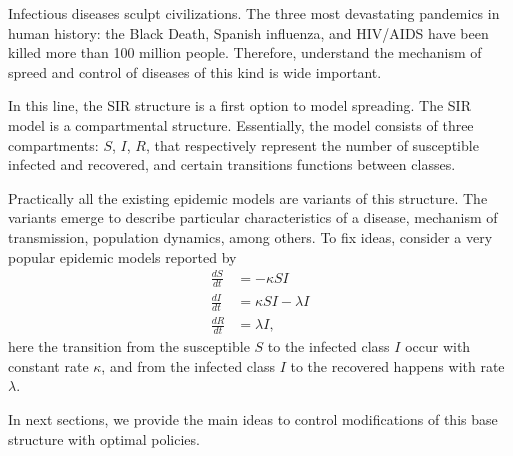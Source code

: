   Infectious diseases sculpt civilizations. The three most devastating 
pandemics in human history: the Black Death, Spanish influenza, and HIV/AIDS
have been killed more than 100 million people. Therefore, understand the
mechanism of spreed and control of diseases of this kind is wide important.

  In this line, the SIR structure is a first option to model spreading. The SIR 
model is a compartmental structure. Essentially, the model consists of three 
compartments: $S$, $I$, $R$, that respectively represent the number of 
susceptible infected and recovered, and certain transitions functions between 
classes.

  Practically all the existing epidemic models are variants of this structure. 
The variants emerge to describe particular characteristics of a disease, 
mechanism of transmission, population dynamics, among others. 
To fix ideas, consider a very  popular epidemic models reported by 
\citet{Kermac}
\begin{equation}
  \begin{aligned}
    \frac{dS}{dt} & = - \kappa SI
      \\
    \frac{dI}{dt} & = \kappa SI - \lambda I
      \\
    \frac{dR}{dt} & = \lambda I,
  \end{aligned}
\end{equation}
here the transition from the susceptible $S$ to the infected class $I$ 
occur with constant rate $\kappa$, and from  the infected class $I$ to the 
recovered happens with rate $\lambda$.

In next sections, we provide the main ideas to control modifications of this 
base structure with optimal policies.